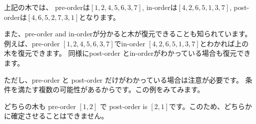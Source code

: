 上記の木では、
pre-orderは$[1,2,4,5,6,3,7]$,
in-orderは$[4,2,6,5,1,3,7]$,
post-orderは$[4,6,5,2,7,3,1]$となります。

また、pre-order and in-orderが分かると木が復元できることも知られています。
例えば、pre-order $[1,2,4,5,6,3,7]$でin-order $[4,2,6,5,1,3,7]$とわかれば上の木を復元できます。
同様にpost-order とin-orderがわかっている場合も復元できます。

ただし、pre-order と post-order だけがわかっている場合は注意が必要です。
条件を満たす複数の可能性があるからです。この例をみてみます。
\begin{center}
\end{center}
どちらの木も pre-order $[1,2]$ で post-order is $[2,1]$です。このため、どちらかに確定させることはできません。
